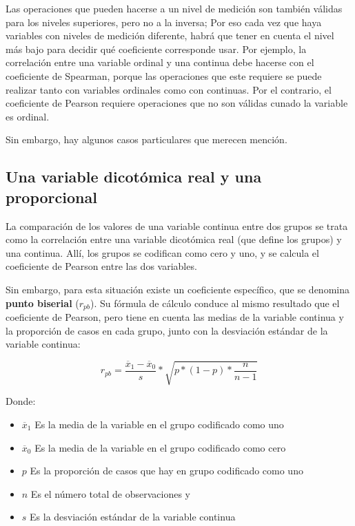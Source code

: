 \documentclass[]{book}
\begin{document}
Las operaciones que pueden hacerse a un nivel de medición
son también válidas para los niveles superiores, pero no a la inversa; Por eso cada vez que haya variables con niveles de medición diferente, habrá que tener en cuenta el nivel más bajo para decidir qué coeficiente corresponde usar. Por ejemplo, la correlación entre una variable ordinal y una continua debe hacerse con el coeficiente de Spearman, porque las operaciones que este requiere se puede realizar tanto con variables ordinales como con continuas. Por el contrario, el coeficiente de Pearson requiere operaciones que no son válidas cunado la variable es ordinal.

Sin embargo, hay algunos casos particulares que merecen mención.

\hypertarget{una-variable-dicotuxf3mica-real-y-una-proporcional}{%
\subsection{Una variable dicotómica real y una proporcional}\label{una-variable-dicotuxf3mica-real-y-una-proporcional}}

La comparación de los valores de una variable continua entre dos grupos se trata como la correlación entre una variable dicotómica real (que define los grupos) y una continua. Allí, los grupos se codifican como cero y uno, y se calcula el coeficiente de Pearson entre las dos variables.

Sin embargo, para esta situación existe un coeficiente específico, que se denomina \textbf{punto biserial} (\(r_{pb}\)). Su fórmula de cálculo conduce al mismo resultado que el coeficiente de Pearson, pero tiene en cuenta las medias de la variable continua y la proporción de casos en cada grupo, junto con la desviación estándar de la variable continua:

\[r_{pb} = \frac{{\overline{x}}_{1} - {\overline{x}}_{0}}{s}*\sqrt{p*(1 - p)*\frac{n}{n - 1}}\]

Donde:

\begin{itemize}
\item
  \({\overline{x}}_{1}\) Es la media de la variable en el grupo codificado como uno
\item
  \({\overline{x}}_{0}\) Es la media de la variable en el grupo codificado como cero
\item
  \(p\) Es la proporción de casos que hay en grupo codificado como uno
\item
  \(n\) Es el número total de observaciones y
\item
  \(s\) Es la desviación estándar de la variable continua
\end{itemize}
\end{document}

